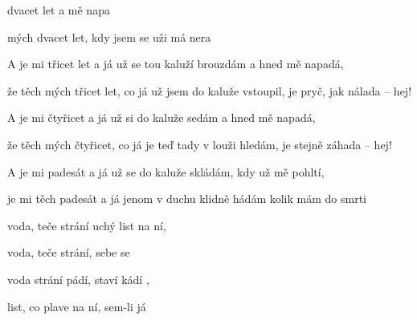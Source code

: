 

\zr
{}     
\kr

\zs
{} dvacet let a 
   mě napa

 mých dvacet let,
kdy  jsem se uži 
má  nera
\ks

\zr \kr

\zs
A je mi třicet let a já už se
tou kaluží brouzdám a hned mě napadá,

že těch mých třicet let,
co já už jsem do kaluže vstoupil,
je pryč, jak nálada -- hej!
\ks

\zr \kr

\zs
A je mi čtyřicet a já už si
do kaluže sedám a hned mě napadá,

že těch mých čtyřicet,
co já je teď tady v louži hledám,
je stejně záhada -- hej!
\ks

\zr \kr

\zs
A je mi padesát a já už se
do kaluže skládám, kdy už mě pohltí,

je mi těch padesát
a já jenom v duchu klidně hádám
kolik mám do smrti
\ks

\zs
{} voda, teče strání
uchý list  na ní,

 voda, teče strání,
 sebe se 

 voda strání pádí,
staví  kádí ,

 list, co plave na ní,
sem-li já 
\ks

\zr \kr

\kp



